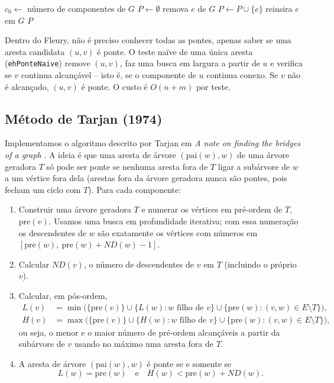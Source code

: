 \documentclass[a4paper,11pt]{article}
\begin{document}
\begin{algorithm}[H]
\caption{Pontes pelo método naïve}\label{alg:naive}
\begin{algorithmic}[1]
\State $c_0 \gets$ número de componentes de $G$ 
\State $P \gets \emptyset$
  \State remova $e$ de $G$
   $P \gets P \cup \{e\}$ \EndIf
  \State reinsira $e$ em $G$
\EndFor
\State \Return $P$
\end{algorithmic}
\end{algorithm}

Dentro do Fleury, não é preciso conhecer todas as pontes, apenas saber se uma aresta candidata
$(u,v)$ é ponte. O teste naïve de uma única aresta (\texttt{ehPonteNaive}) remove $(u,v)$, faz uma busca
em largura a partir de $u$ e verifica se $v$ continua alcançável -- isto é, se o componente de $u$
continua conexo. Se $v$ não é alcançado, $(u,v)$ é ponte. O custo é $O(n+m)$ por teste.

\subsection{Método de Tarjan (1974)}

Implementamos o algoritmo descrito por Tarjan em \emph{A note on finding the bridges of a graph}
\cite{tarjan1974}. A ideia é que uma aresta de árvore $(\mathrm{pai}(w), w)$ de uma árvore geradora $T$
só pode ser ponte se nenhuma aresta fora de $T$ ligar a subárvore de $w$ a um vértice fora dela (arestas
fora da árvore geradora nunca são pontes, pois fecham um ciclo com $T$). Para cada componente:

\begin{enumerate}
  \item Construir uma árvore geradora $T$ e numerar os vértices em pré-ordem de $T$, $\mathrm{pre}(v)$.
        Usamos uma busca em profundidade iterativa; com essa numeração os descendentes de $w$ são
        exatamente os vértices com números em $[\mathrm{pre}(w),\ \mathrm{pre}(w)+ND(w)-1]$.
  \item Calcular $ND(v)$, o número de descendentes de $v$ em $T$ (incluindo o próprio $v$).
  \item Calcular, em pós-ordem,
  \begin{align*}
    L(v) &= \min\big(\{\mathrm{pre}(v)\} \cup \{L(w) : w \text{ filho de } v\} \cup \{\mathrm{pre}(w) : (v,w)\in E\setminus T\}\big),\\
    H(v) &= \max\big(\{\mathrm{pre}(v)\} \cup \{H(w) : w \text{ filho de } v\} \cup \{\mathrm{pre}(w) : (v,w)\in E\setminus T\}\big),
  \end{align*}
  ou seja, o menor e o maior número de pré-ordem alcançáveis a partir da subárvore de $v$ usando no
  máximo uma aresta fora de $T$.
  \item A aresta de árvore $(\mathrm{pai}(w), w)$ é ponte se e somente se
  \[ L(w) = \mathrm{pre}(w) \quad\text{e}\quad H(w) < \mathrm{pre}(w) + ND(w). \]
\end{enumerate}
\end{document}
